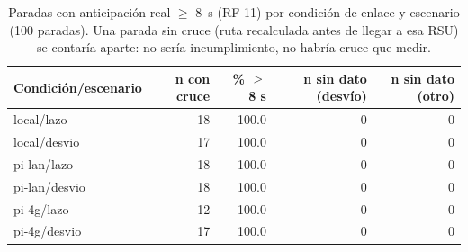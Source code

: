 \begin{table}[H]
\centering
\caption{Paradas con anticipación real $\geq$ 8~s (RF-11) por condición de enlace y escenario (100 paradas). Una parada sin cruce (ruta recalculada antes de llegar a esa RSU) se contaría aparte: no sería incumplimiento, no habría cruce que medir.}
\label{tab:anticipacion_parada}
\small
\begin{tabular}{lrrrr}
\toprule
\textbf{Condición/escenario} & \textbf{n con cruce} & \textbf{\% $\geq$ 8 s} & \textbf{n sin dato (desvío)} & \textbf{n sin dato (otro)} \\
\midrule
local/lazo & 18 & 100.0 & 0 & 0 \\
local/desvio & 17 & 100.0 & 0 & 0 \\
pi-lan/lazo & 18 & 100.0 & 0 & 0 \\
pi-lan/desvio & 18 & 100.0 & 0 & 0 \\
pi-4g/lazo & 12 & 100.0 & 0 & 0 \\
pi-4g/desvio & 17 & 100.0 & 0 & 0 \\
\bottomrule
\end{tabular}
\end{table}
